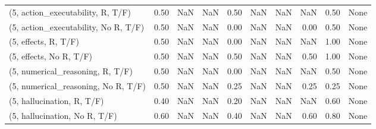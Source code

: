 \begin{table*}[h!]
\begin{adjustbox}{width=2\columnwidth,center}
\begin{tabular}{lrrr|rrr|rrr}
(5, action\_executability, R, T/F)    &                      0.50 &                   NaN &                       NaN &                          0.50 &                       NaN &                           NaN &                                    NaN &                               0.50 &                                  None \\
(5, action\_executability, No R, T/F) &                      0.50 &                   NaN &                       NaN &                          0.00 &                       NaN &                           NaN &                                   0.00 &                               0.50 &                                  None \\
(5, effects, R, T/F)                 &                      0.50 &                   NaN &                       NaN &                          0.00 &                       NaN &                           NaN &                                    NaN &                               1.00 &                                  None \\
(5, effects, No R, T/F)              &                      0.50 &                   NaN &                       NaN &                          0.50 &                       NaN &                           NaN &                                   0.50 &                               1.00 &                                  None \\
(5, numerical\_reasoning, R, T/F)     &                      0.50 &                   NaN &                       NaN &                          0.00 &                       NaN &                           NaN &                                    NaN &                               0.50 &                                  None \\
(5, numerical\_reasoning, No R, T/F)  &                      0.50 &                   NaN &                       NaN &                          0.25 &                       NaN &                           NaN &                                   0.25 &                               0.25 &                                  None \\
(5, hallucination, R, T/F)           &                      0.40 &                   NaN &                       NaN &                          0.20 &                       NaN &                           NaN &                                    NaN &                               0.60 &                                  None \\
(5, hallucination, No R, T/F)        &                      0.60 &                   NaN &                       NaN &                          0.40 &                       NaN &                           NaN &                                   0.60 &                               0.80 &                                  None \\

\end{tabular}
\end{adjustbox}
\end{table*}
